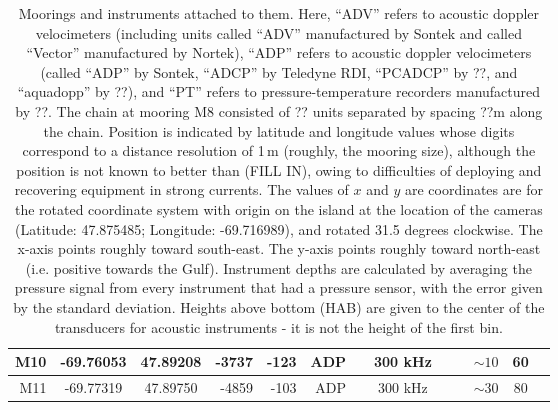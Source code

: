 \documentclass[letterpaper,10pt,landscape]{article}
\begin{document}
\begin{table}
\begin{tabular}{|r|c|c|r|r|r|r|c|c|c|c|c|c|}
    M10                 & -69.76053                  & 47.89208                  & -3737                  & -123                  & ADP          &          & 300 kHz  &           &          & $\sim10$   & 60                  \\\hline
    M11                 & -69.77319                  & 47.89750                  & -4859                  & -103                  & ADP          &          & 300 kHz  &           &          & $\sim30$   & 80                  \\\hline
  \end{tabular}
  
  \caption{Moorings and instruments attached to them.  Here, ``ADV''
    refers to acoustic doppler velocimeters (including units called
    ``ADV'' manufactured by Sontek and called ``Vector'' manufactured
    by Nortek), ``ADP'' refers to acoustic doppler velocimeters
    (called ``ADP'' by Sontek, ``ADCP'' by Teledyne RDI, ``PCADCP'' by
    ??, and ``aquadopp'' by ??), and ``PT'' refers to
    pressure-temperature recorders manufactured by ??.  The chain at
    mooring M8 consisted of ?? units separated by spacing ??m along
    the chain.  Position is indicated by latitude and longitude values
    whose digits correspond to a distance resolution of 1\,m (roughly,
    the mooring size), although the position is not known to better
    than (FILL IN), owing to difficulties of deploying and recovering
    equipment in strong currents.  The values of $x$ and $y$ are
    coordinates are for the rotated coordinate system with origin on
    the island at the location of the cameras (Latitude: 47.875485;
    Longitude: -69.716989), and rotated 31.5 degrees clockwise. The
    x-axis points roughly toward south-east. The y-axis points roughly
    toward north-east (i.e. positive towards the Gulf). Instrument
    depths are calculated by averaging the pressure signal from every
    instrument that had a pressure sensor, with the error given by the
    standard deviation. Heights above bottom (HAB) are given to the
    center of the transducers for acoustic instruments - it is not the
    height of the first bin.}
  \end{table}
\end{document}
